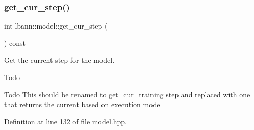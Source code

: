 \mbox{\label{classlbann_1_1model_ad0cdcba177434b52dc9c4a97be183a92}} 
\subsubsection{\texorpdfstring{get\+\_\+cur\+\_\+step()}{get\_cur\_step()}}
{\footnotesize\ttfamily int lbann\+::model\+::get\+\_\+cur\+\_\+step (\begin{DoxyParamCaption}{ }\end{DoxyParamCaption}) const\hspace{0.3cm}{\ttfamily [inline]}}

Get the current step for the model. \begin{DoxyRefDesc}{Todo}
\item[\hyperlink{todo__todo000026}{Todo}]This should be renamed to get\+\_\+cur\+\_\+training step and replaced with one that returns the current based on execution mode \end{DoxyRefDesc}


Definition at line 132 of file model.\+hpp.


